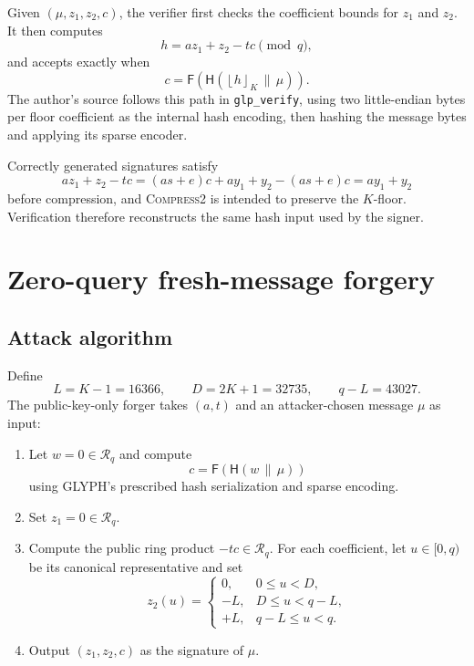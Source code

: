 \documentclass[10pt,a4paper]{article}
\newcommand{\Rq}{\mathcal{R}_q}
\newcommand{\Kfloor}[1]{\left\lfloor #1\right\rfloor_K}
\newcommand{\Hash}{\mathsf{H}}
\newcommand{\Encode}{\mathsf{F}}
\begin{document}
Given $(\mu,z_1,z_2,c)$, the verifier first checks the coefficient bounds for
$z_1$ and $z_2$.  It then computes
\begin{equation}
  h=az_1+z_2-tc\pmod q,
  \label{eq:reconstruct}
\end{equation}
and accepts exactly when
\begin{equation}
  c=\Encode\!\left(\Hash\!\left(
      \Kfloor{h}\,\|\,\mu
  \right)\right).
  \label{eq:verify}
\end{equation}
The author's source follows this path in \texttt{glp\_verify}, using two
little-endian bytes per floor coefficient as the internal hash encoding,
then hashing the message bytes and applying its sparse encoder.

Correctly generated signatures satisfy
\[
  az_1+z_2-tc=(as+e)c+ay_1+y_2-(as+e)c=ay_1+y_2
\]
before compression, and \textsc{Compress2} is intended to preserve the
$K$-floor.  Verification therefore reconstructs the same hash input used by
the signer.

\section{Zero-query fresh-message forgery}

\subsection{Attack algorithm}

Define
\[
  L=K-1=16366,
  \qquad D=2K+1=32735,
  \qquad q-L=43027.
\]
The public-key-only forger takes $(a,t)$ and an attacker-chosen message
$\mu$ as input:
\begin{enumerate}
  \item Let $w=0\in\Rq$ and compute
  \[
    c=\Encode\!\left(\Hash(w\,\|\,\mu)\right)
  \]
  using GLYPH's prescribed hash serialization and sparse encoding.
  \item Set $z_1=0\in\Rq$.
  \item Compute the public ring product $-tc\in\Rq$.  For each coefficient,
  let $u\in[0,q)$ be its canonical representative and set
  \begin{equation}
  z_2(u)=
  \begin{cases}
    0,  & 0\le u<D,\\
    -L, & D\le u<q-L,\\
    +L, & q-L\le u<q.
  \end{cases}
  \label{eq:selector}
  \end{equation}
  \item Output $(z_1,z_2,c)$ as the signature of $\mu$.
\end{enumerate}
\end{document}
